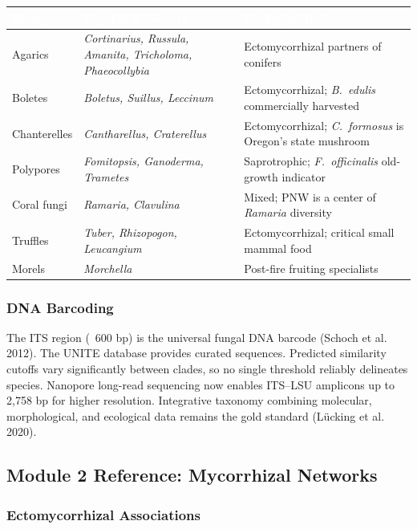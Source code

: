 \documentclass[11pt,letterpaper]{article}
\newcommand{\tableheader}[1]{\textbf{\sffamily\textcolor{white}{#1}}}
\begin{document}
\begin{center}
\begin{tabularx}{\textwidth}{L{2.5cm}L{3.5cm}X}
\toprule
{}
\tableheader{Group} & \tableheader{Key PNW Genera} & \tableheader{Ecological Role} \\
\midrule
Agarics & \textit{Cortinarius, Russula, Amanita, Tricholoma, Phaeocollybia} & Ectomycorrhizal partners of conifers \\
Boletes & \textit{Boletus, Suillus, Leccinum} & Ectomycorrhizal; \textit{B.~edulis} commercially harvested \\
Chanterelles & \textit{Cantharellus, Craterellus} & Ectomycorrhizal; \textit{C.~formosus} is Oregon's state mushroom \\
Polypores & \textit{Fomitopsis, Ganoderma, Trametes} & Saprotrophic; \textit{F.~officinalis} old-growth indicator \\
Coral fungi & \textit{Ramaria, Clavulina} & Mixed; PNW is a center of \textit{Ramaria} diversity \\
Truffles & \textit{Tuber, Rhizopogon, Leucangium} & Ectomycorrhizal; critical small mammal food \\
Morels & \textit{Morchella} & Post-fire fruiting specialists \\
\bottomrule
\end{tabularx}
\end{center}

\subsubsection{DNA Barcoding}

The ITS region (~600 bp) is the universal fungal DNA barcode (Schoch et al. 2012). The UNITE database provides curated sequences. Predicted similarity cutoffs vary significantly between clades, so no single threshold reliably delineates species. Nanopore long-read sequencing now enables ITS--LSU amplicons up to 2,758 bp for higher resolution. Integrative taxonomy combining molecular, morphological, and ecological data remains the gold standard (Lücking et al. 2020).

\subsection{Module 2 Reference: Mycorrhizal Networks}

\subsubsection{Ectomycorrhizal Associations}
\end{document}

